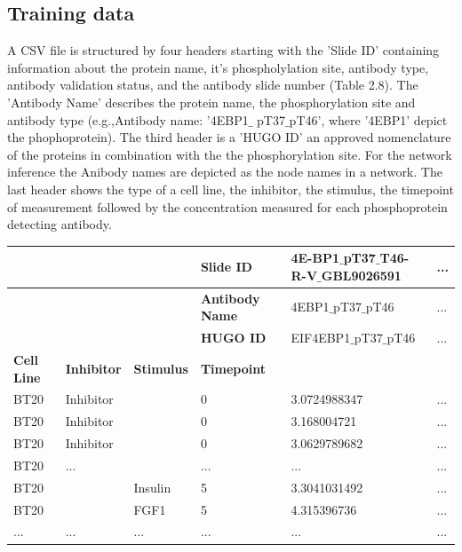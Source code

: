 \subsection*{Training data}
A \gls{CSV} file is structured by four headers starting with the 'Slide ID' containing information about the protein name, it's phospholylation site, antibody type, antibody validation status, and the antibody slide number (Table 2.8). The 'Antibody Name' describes the protein name, the phosphorylation site and antibody type (e.g.,Antibody name: '4EBP1$\_$ pT37$\_$pT46', where '4EBP1' depict the phophoprotein). The third header is a 'HUGO ID' an approved nomenclature of the proteins in combination with the the phosphorylation site. For the network inference the Anibody names are depicted as the node names in a network.
The last header shows the type of a cell line, the inhibitor, the stimulus, the timepoint of measurement followed by the concentration measured for each phosphoprotein detecting antibody.
\begin{table}[!h]
{\tabcolsep=3pt%
\begin{center}
\scriptsize
\begin{tabular}{llllll}
\toprule 
 & & & \textbf{Slide ID} & 4E-BP1$\_$pT37$\_$T46-R-V$\_$GBL9026591 & ... \\
\toprule
 & & & \textbf{Antibody Name} & 4EBP1$\_$pT37$\_$pT46 & ... \\
\toprule
 & & & \textbf{HUGO ID} & EIF4EBP1$\_$pT37$\_$pT46 & ... \\
\toprule
 \textbf{Cell Line} & \textbf{Inhibitor} & \textbf{Stimulus} & \textbf{Timepoint} & & \\
\hline
\rowcolor{black!10} BT20 & Inhibitor &   & 0 & 3.0724988347 & ...\\
 					BT20 & Inhibitor	& 	& 0 & 3.168004721 & ...\\
\rowcolor{black!10} BT20 & Inhibitor	&	& 0	& 3.0629789682	& ...\\
 					BT20 & ...	&	& ... & ...	& ...\\
\rowcolor{black!10} BT20 &	& Insulin	& 5	& 3.3041031492	&...\\
 					BT20 & 	& FGF1 &	5 & 4.315396736	& ...\\
\rowcolor{black!10} ... &	...	& ... &	...	& ...	& ... \\
\bottomrule
\end{tabular}
\end{center}
}
\end{table}







